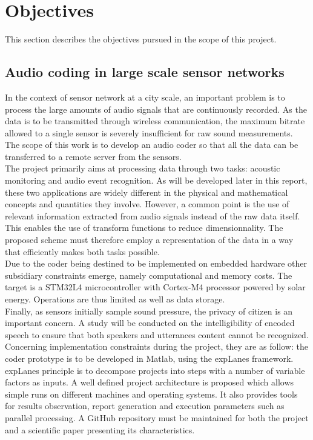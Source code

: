 \documentclass[12pt,times,onecolumn]{article}
\begin{document}
\section{Objectives}
This section describes the objectives pursued in the scope of this project.
\subsection{Audio coding in large scale sensor networks}
In the context of sensor network at a city scale, an important problem is to process the large amounts of audio signals that are continuously recorded. As the data is to be transmitted through wireless communication, the maximum bitrate allowed to a single sensor is severely insufficient for raw sound measurements. The scope of this work is to develop an audio coder so that all the data can be transferred to a remote server from the sensors.\\

The project primarily aims at processing data through two tasks: acoustic monitoring and audio event recognition. As will be developed later in this report, these two applications are widely different in the physical and mathematical concepts and quantities they involve. However, a common point is the use of relevant information extracted from audio signals instead of the raw data itself. This enables the use of transform functions to reduce dimensionnality. The proposed scheme must therefore employ a representation of the data in a way that efficiently makes both tasks possible.\\

Due to the coder being destined to be implemented on embedded hardware other subsidiary constraints emerge, namely computational and memory costs. The target is a STM32L4 microcontroller with Cortex-M4 processor powered by solar energy. Operations are thus limited as well as data storage.\\

Finally, as sensors initially sample sound pressure, the privacy of citizen is an important concern. A study will be conducted on the intelligibility of encoded speech to ensure that both speakers and utterances content cannot be recognized.\\

Concerning implementation constraints during the project, they are as follow: the coder prototype is to be developed in Matlab, using the expLanes \cite{explanes} framework. expLanes principle is to decompose projects into steps with a number of variable factors as inputs. A well defined project architecture is proposed which allows simple runs on different machines and operating systems. It also provides tools for results observation, report generation and execution parameters such as parallel processing. A GitHub repository must be maintained for both the project and a scientific paper presenting its characteristics.
\end{document}
